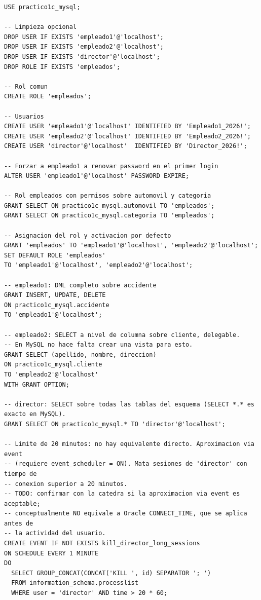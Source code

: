 \documentclass[11pt,a4paper]{article}
\begin{document}
\begin{lstlisting}
USE practico1c_mysql;

-- Limpieza opcional
DROP USER IF EXISTS 'empleado1'@'localhost';
DROP USER IF EXISTS 'empleado2'@'localhost';
DROP USER IF EXISTS 'director'@'localhost';
DROP ROLE IF EXISTS 'empleados';

-- Rol comun
CREATE ROLE 'empleados';

-- Usuarios
CREATE USER 'empleado1'@'localhost' IDENTIFIED BY 'Empleado1_2026!';
CREATE USER 'empleado2'@'localhost' IDENTIFIED BY 'Empleado2_2026!';
CREATE USER 'director'@'localhost'  IDENTIFIED BY 'Director_2026!';

-- Forzar a empleado1 a renovar password en el primer login
ALTER USER 'empleado1'@'localhost' PASSWORD EXPIRE;

-- Rol empleados con permisos sobre automovil y categoria
GRANT SELECT ON practico1c_mysql.automovil TO 'empleados';
GRANT SELECT ON practico1c_mysql.categoria TO 'empleados';

-- Asignacion del rol y activacion por defecto
GRANT 'empleados' TO 'empleado1'@'localhost', 'empleado2'@'localhost';
SET DEFAULT ROLE 'empleados'
TO 'empleado1'@'localhost', 'empleado2'@'localhost';

-- empleado1: DML completo sobre accidente
GRANT INSERT, UPDATE, DELETE
ON practico1c_mysql.accidente
TO 'empleado1'@'localhost';

-- empleado2: SELECT a nivel de columna sobre cliente, delegable.
-- En MySQL no hace falta crear una vista para esto.
GRANT SELECT (apellido, nombre, direccion)
ON practico1c_mysql.cliente
TO 'empleado2'@'localhost'
WITH GRANT OPTION;

-- director: SELECT sobre todas las tablas del esquema (SELECT *.* es exacto en MySQL).
GRANT SELECT ON practico1c_mysql.* TO 'director'@'localhost';

-- Limite de 20 minutos: no hay equivalente directo. Aproximacion via event
-- (requiere event_scheduler = ON). Mata sesiones de 'director' con tiempo de
-- conexion superior a 20 minutos.
-- TODO: confirmar con la catedra si la aproximacion via event es aceptable;
-- conceptualmente NO equivale a Oracle CONNECT_TIME, que se aplica antes de
-- la actividad del usuario.
CREATE EVENT IF NOT EXISTS kill_director_long_sessions
ON SCHEDULE EVERY 1 MINUTE
DO
  SELECT GROUP_CONCAT(CONCAT('KILL ', id) SEPARATOR '; ')
  FROM information_schema.processlist
  WHERE user = 'director' AND time > 20 * 60;
\end{lstlisting}
\end{document}
